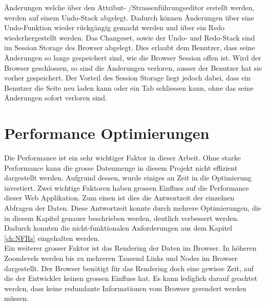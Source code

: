 \noindent
Änderungen welche über den Attribut- /Strassenführungseditor erstellt werden, werden auf einem Undo-Stack abgelegt. Dadurch können Änderungen über eine Undo-Funktion wieder rückgängig gemacht werden und über ein Redo wiederhergestellt werden. Das Changeset, sowie der Undo- und Redo-Stack sind im Session Storage des Browser abgelegt. Dies erlaubt dem Benutzer, dass seine Änderungen so lange gespeichert sind, wie die Browser Session offen ist. Wird der Browser geschlossen, so sind die Änderungen verloren, ausser der Benutzer hat sie vorher gespeichert. Der Vorteil des Session Storage liegt jedoch dabei, dass ein Benutzer die Seite neu laden kann oder ein Tab schliessen kann, ohne das seine Änderungen sofort verloren sind.
\section{Performance Optimierungen}
Die Performance ist ein sehr wichtiger Faktor in dieser Arbeit. Ohne starke Performance kann die grosse Datenmenge in diesem Projekt nicht effizient dargestellt werden. Aufgrund dessen, wurde einiges an Zeit in die Optimierung investiert. Zwei wichtige Faktoren haben grossen Einfluss auf die Performance dieser Web Applikation. Zum einen ist dies die Antwortzeit der einzelnen Abfragen der Daten. Diese Antwortzeit konnte durch mehrere Optimierungen, die in diesem Kapitel genauer beschrieben werden, deutlich verbessert werden. Dadurch konnten die nicht-funktionalen Anforderungen aus dem Kapitel \ref{ch:NFRs} eingehalten werden.\\
Ein weiterer grosser Faktor ist das Rendering der Daten im Browser. In höheren Zoomlevels werden bis zu mehreren Tausend Links und Nodes im Browser dargestellt. Der Browser benötigt für das Rendering doch eine gewisse Zeit, auf die der Entwickler keinen grossen Einfluss hat. Es kann lediglich darauf geachtet werden, dass keine redundante Informationen vom Browser gerendert werden müssen.
